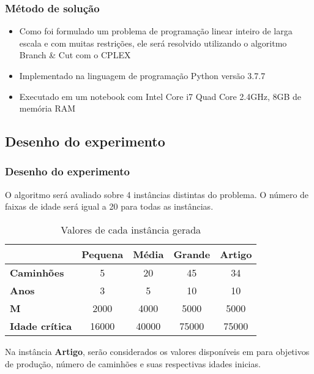 \documentclass{beamer}
\begin{document}
\begin{frame}
	\frametitle{Método de solução}
	\begin{itemize}
		\item Como foi formulado um problema de programação linear inteiro de larga escala e com muitas restrições, ele será resolvido utilizando o algoritmo Branch \& Cut com o CPLEX
		\item Implementado na linguagem de programação Python versão 3.7.7
		\item Executado em um notebook com Intel Core i7 Quad Core 2.4GHz, 8GB de memória RAM
	\end{itemize}
\end{frame}


\subsection{Desenho do experimento}

\begin{frame}
	\frametitle{Desenho do experimento}
	O algoritmo será avaliado sobre 4 instâncias distintas do problema.	O número de faixas de idade será igual a 20 para todas as instâncias.
	\begin{table}[h!]
	\caption{Valores de cada instância gerada}
	\label{tab:instances}
	\centering
	\begin{tabular}{l|c|c|c|c|}
		\cline{2-5}
		& \textbf{Pequena} & \textbf{Média} & \textbf{Grande} & \textbf{Artigo} \\ \hline
		\multicolumn{1}{|l|}{\textbf{Caminhões}} & 5                & 20             & 45              & 34              \\ \hline
		\multicolumn{1}{|l|}{\textbf{Anos}}      & 3                & 5              & 10              & 10              \\ \hline
		\multicolumn{1}{|l|}{\textbf{M}}         & 2000             & 4000           & 5000            & 5000            \\ \hline
		\multicolumn{1}{|l|}{\textbf{Idade crítica}}         & 16000             & 40000           & 75000            & 	75000            \\ \hline
	\end{tabular}
	\end{table}
	Na instância \textbf{Artigo}, serão considerados os valores disponíveis em \cite{topal2010a} para objetivos de produção, número de caminhões e suas respectivas idades inicias.
	

\end{frame}	
\end{document}

